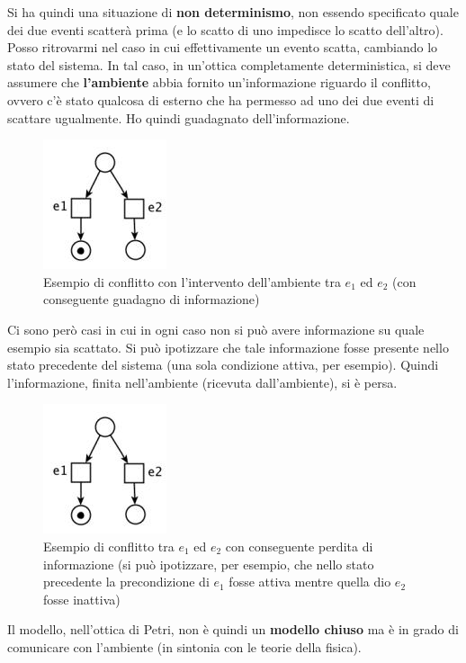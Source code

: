 \documentclass[a4paper,12pt, oneside]{book}
\begin{document}
\begin{definizione}
  Si ha quindi una situazione di \textbf{non determinismo}, non essendo
  specificato quale dei due eventi scatterà prima (e lo scatto di uno impedisce
  lo scatto dell'altro).
  \newpage
  Posso ritrovarmi nel caso in cui effettivamente un evento scatta, cambiando lo
  stato del sistema. In tal caso, in un'ottica completamente deterministica, si
  deve assumere che \textbf{l'ambiente} abbia fornito un'informazione
  riguardo il conflitto, ovvero c'è stato qualcosa di esterno che ha permesso ad
  uno dei due eventi di scattare ugualmente. Ho quindi guadagnato
  dell'informazione. 
  \begin{figure}[H]
    \centering
    \includegraphics[scale = 0.7]{img/conf3.jpg}
    \caption{Esempio di conflitto con l'intervento dell'ambiente tra $e_1$ ed
      $e_2$ (con conseguente guadagno di informazione)} 
  \end{figure}
  Ci sono però casi in cui in ogni caso non si può avere informazione su quale
  esempio sia scattato. Si può ipotizzare che tale informazione fosse presente
  nello stato precedente del sistema (una sola condizione attiva, per
  esempio). Quindi l'informazione, finita nell'ambiente (ricevuta
  dall'ambiente), si è persa.
   \begin{figure}[H]
    \centering
    \includegraphics[scale = 0.7]{img/conf3.jpg}
    \caption{Esempio di conflitto tra $e_1$ ed
      $e_2$ con conseguente perdita di informazione (si può ipotizzare, per
      esempio, che nello stato precedente la precondizione di $e_1$ fosse attiva
      mentre quella dio $e_2$ fosse inattiva)} 
  \end{figure}
  Il modello, nell'ottica di Petri, non è quindi un \textbf{modello chiuso} ma è
  in grado di comunicare con l'ambiente (in sintonia con le teorie della
  fisica). 
\end{definizione}
\newpage
\end{document}
